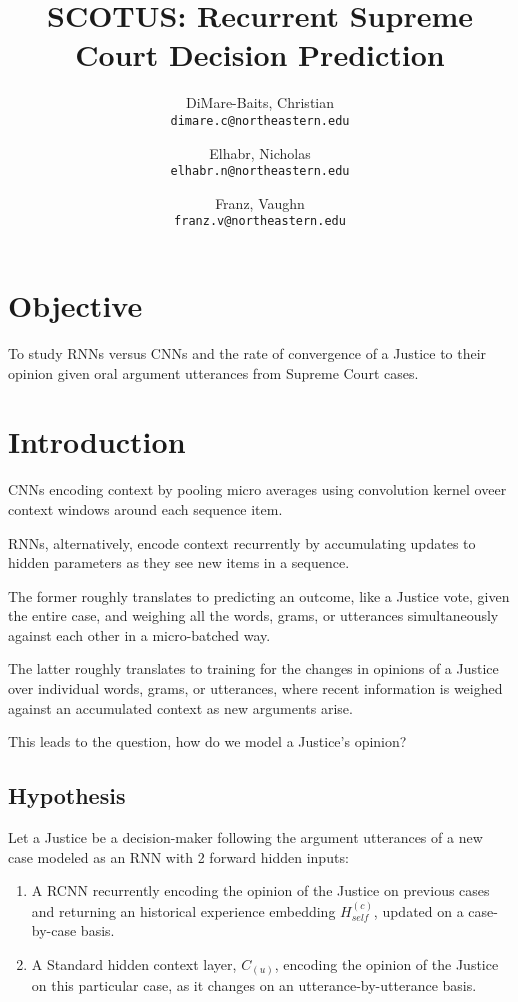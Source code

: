 \documentclass[a4paper]{article}
\title{SCOTUS: Recurrent Supreme Court Decision Prediction}
\author{
  DiMare-Baits, Christian\\
  \texttt{dimare.c@northeastern.edu}
  \and
  Elhabr, Nicholas\\
  \texttt{elhabr.n@northeastern.edu}
  \and
  Franz, Vaughn\\
  \texttt{franz.v@northeastern.edu}
}
\date{}
\begin{document}
\maketitle

\section{Objective}
To study RNNs versus CNNs and the rate of convergence of a Justice to their opinion given oral argument utterances from Supreme Court cases.

\section{Introduction}
CNNs encoding context by pooling micro averages using convolution kernel oveer context windows around each sequence item.

RNNs, alternatively, encode context recurrently by accumulating updates to hidden parameters as they see new items in a sequence.

The former roughly translates to predicting an outcome, like a Justice vote, given the entire case, and weighing all the words, grams, or utterances simultaneously against each other in a micro-batched way.

The latter roughly translates to training for the changes in opinions of a Justice over individual words, grams, or utterances, where recent information is weighed against an accumulated context as new arguments arise.

This leads to the question, how do we model a Justice's opinion?

\subsection{Hypothesis}
Let a Justice be a decision-maker following the argument utterances of a new case modeled as an RNN with 2 forward hidden inputs:

\begin{enumerate}
  \item A RCNN recurrently encoding the opinion of the Justice on previous cases and returning an historical experience embedding $H_{self}^{(c)}$, updated on a case-by-case basis.
  \item A Standard hidden context layer, $C_{(u)}$, encoding the opinion of the Justice on this particular case, as it changes on an utterance-by-utterance basis.
\end{enumerate}
\end{document}
